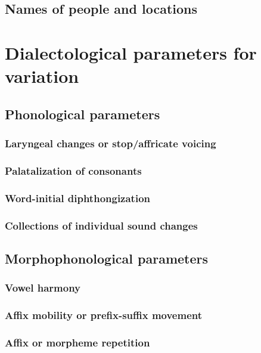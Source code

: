 \subsection{Names of people and locations}

\section{Dialectological parameters for variation}
\subsection{Phonological parameters}

\subsubsection{Laryngeal changes or stop/affricate voicing}

\subsubsection{Palatalization of consonants}

\subsubsection{Word-initial diphthongization}

\subsubsection{Collections of individual sound changes}

\subsection{Morphophonological parameters}

\subsubsection{Vowel harmony}

\subsubsection{Affix mobility or prefix-suffix movement}

\subsubsection{Affix or morpheme repetition}


